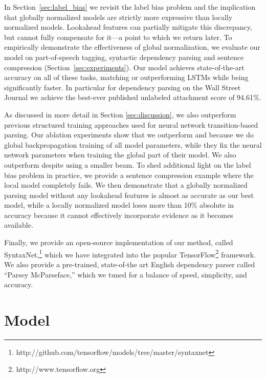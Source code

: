 \documentclass[11pt]{article}
\begin{document}
In Section~\ref{sec:label_bias} we revisit the label bias problem and the implication that
globally normalized models are strictly more expressive than
locally normalized models.
Lookahead features can partially mitigate this discrepancy, but cannot fully
compensate for it---a point to which we return later.
To empirically demonstrate the effectiveness of global normalization, we evaluate our model
on part-of-speech tagging, syntactic dependency parsing
and sentence compression (Section~\ref{sec:experiments}).
Our model achieves state-of-the-art accuracy on all of these tasks,
matching or outperforming LSTMs while being significantly faster.
In particular for dependency parsing on the Wall Street Journal
we achieve the best-ever published unlabeled
attachment score of 94.61\%.

As discussed in more detail in Section \ref{sec:discussion},
we also outperform previous structured training
approaches used for neural network transition-based parsing.
Our ablation experiments show that
we outperform  and 
because we do global backpropagation training of all model parameters, while
they fix the neural network parameters when training the global part of their model.
We also outperform  despite using a smaller beam.
To shed additional light on the label bias problem in practice,
we provide a sentence compression example where the local model completely fails.
We then demonstrate that a globally normalized parsing model without any lookahead
features is almost as accurate as our best model,
while a locally normalized model loses more than 10\% absolute in accuracy
because it cannot effectively incorporate evidence as it becomes available.

Finally, we provide an open-source implementation of our method, called
SyntaxNet,\footnote{http://github.com/tensorflow/models/tree/master/syntaxnet}
which we have integrated into the popular TensorFlow\footnote{http://www.tensorflow.org} 
framework. We also provide a pre-trained,
state-of-the art English dependency parser called ``Parsey McParseface,'' which
we tuned for a balance of speed, simplicity, and accuracy.

 \section{Model}
\label{sec:model}
\newcommand{\score}{\rho}
\newcommand{\starts}{s^{\dagger}}
\newcommand{\xt}{{; \theta}}
\newcommand{\xtt}{{\theta}}
\newcommand{\cx}{{}}
\end{document}

